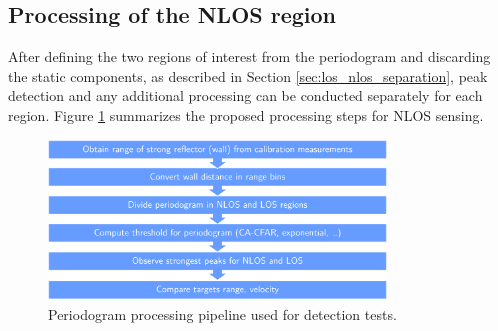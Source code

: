 		\subsection{Processing of the NLOS region}
			After defining the two regions of interest from the periodogram and discarding the static components, as described in Section \ref{sec:los_nlos_separation}, peak detection and any additional processing can be conducted separately for each region. 
			Figure \ref{fig:Test1_NLOS-proc-pipeline} summarizes the proposed processing steps for NLOS sensing.
			\begin{figure}[H]
				\centering
				\includegraphics[width=0.8\textwidth]{Images/Test1/NLOS-proc-pipeline_wide_text12.png}
				\caption{\small Periodogram processing pipeline used for detection tests.}
				\label{fig:Test1_NLOS-proc-pipeline}
			\end{figure}
